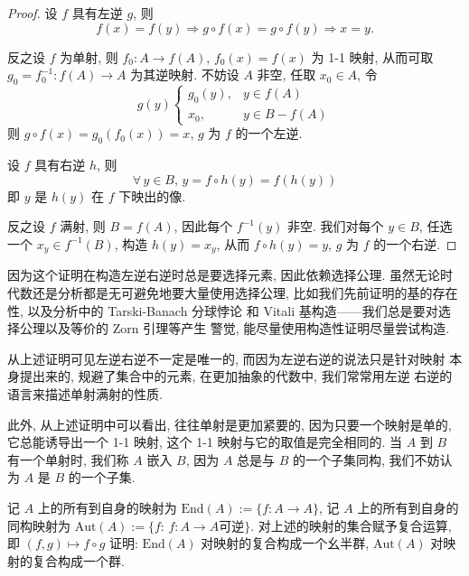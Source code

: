 \documentclass[UTF8]{book}
\begin{document}
\begin{proof}
    设 $f$ 具有左逆 $g$, 则 
    $$f(x)=f(y) \Longrightarrow g\circ f(x) = g\circ f(y) 
    \Longrightarrow x=y.  $$

    反之设 $f$ 为单射, 则 $f_0: A \to f(A)$, $f_0(x)=f(x)$ 为 1-1 映射, 
    从而可取 $g_0 = f_0^{-1}: f(A)\to A $ 为其逆映射. 
    不妨设 $A$ 非空, 任取 $x_0 \in A$, 令
    $$g(y)
    \begin{cases}
        g_0(y), & y \in f(A)\\
        x_0, & y \in B-f(A)
    \end{cases}
    $$
    则 $g\circ f(x) = g_0(f_0(x)) = x$, $g$ 为 $f$ 的一个左逆. 

    设 $f$ 具有右逆 $h$, 则 
    $$ \forall\,y \in B,\,y = f\circ h(y) = f(h(y)) $$ 
    即 $y$ 是 $h(y)$ 在 $f$ 下映出的像. 

    反之设 $f$ 满射, 则 $B=f(A)$, 因此每个 $f^{-1}(y)$ 非空. 
    我们对每个 $y \in B$, 
    任选一个 $x_y \in f^{-1}(B)$, 
    构造 $h(y) = x_y$, 从而 $f\circ h(y) = y$, $g$ 为 $f$ 的一个右逆. 
\end{proof}

\begin{remark}
    因为这个证明在构造左逆右逆时总是要选择元素, 因此依赖选择公理. 
    虽然无论时代数还是分析都是无可避免地要大量使用选择公理, 
    比如我们先前证明的基的存在性, 以及分析中的 Tarski-Banach 分球悖论
    和 Vitali 基构造——我们总是要对选择公理以及等价的 Zorn 引理等产生
    警觉, 能尽量使用构造性证明尽量尝试构造. 
\end{remark}

从上述证明可见左逆右逆不一定是唯一的, 而因为左逆右逆的说法只是针对映射
本身提出来的, 规避了集合中的元素, 在更加抽象的代数中, 我们常常用左逆
右逆的语言来描述单射满射的性质. 

此外, 从上述证明中可以看出, 往往单射是更加紧要的, 因为只要一个映射是单的, 
它总能诱导出一个 1-1 映射, 这个 1-1 映射与它的取值是完全相同的. 
当 $A$ 到 $B$ 有一个单射时, 我们称 $A$ 嵌入 $B$, 因为 $A$ 总是与 $B$ 
的一个子集同构, 我们不妨认为 $A$ 是 $B$ 的一个子集. 

\begin{exercise}
    记 $A$ 上的所有到自身的映射为 
    $\mathrm{End}(A):=\{f:A\to A\}$, 
    记 $A$ 上的所有到自身的同构映射为 
    $\mathrm{Aut}(A):=\{f:\,f:A\to A\mbox{可逆}\}$. 
    对上述的映射的集合赋予复合运算, 即 $(f,g) \mapsto f\circ g$
    证明: 
    $\mathrm{End}(A)$ 对映射的复合构成一个幺半群, 
    $\mathrm{Aut}(A)$ 对映射的复合构成一个群. 
\end{exercise}
\end{document}
